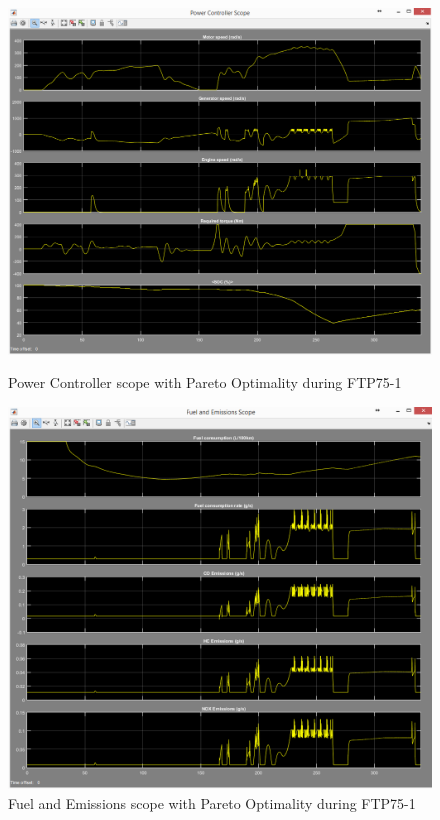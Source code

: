 \begin{figure}[hp]
\centering
\includegraphics[scale=0.4]{figures/Pareto/FTP75-1/powerController30Juni}
\caption{Power Controller scope with Pareto Optimality during FTP75-1}
\label{fig:pcpo1}
\includegraphics[scale=0.43]{figures/Pareto/FTP75-1/fuelEmissions30Juni}
\caption{Fuel and Emissions scope with Pareto Optimality during FTP75-1}
\label{fig:fepo1}
\end{figure}



